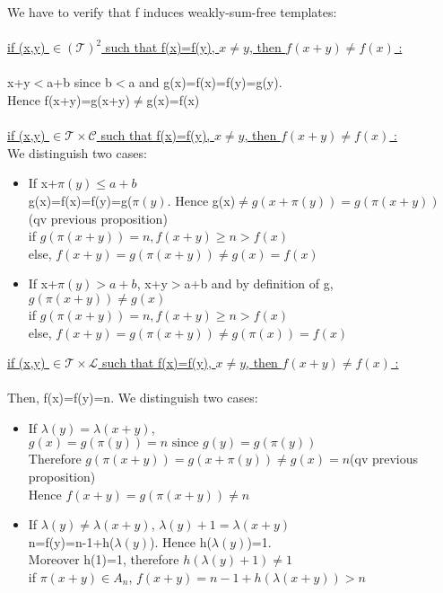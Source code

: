 We have to verify that f induces weakly-sum-free templates:\\
\\
\underline{if (x,y) \(\in (\mathcal{T})^2\) such that f(x)=f(y), \(x \neq y\), then \(f(x+y)\neq f(x)\)  :}\\
\\x+y\(<\)a+b since b\(<\)a and g(x)=f(x)=f(y)=g(y).
\\Hence f(x+y)=g(x+y)\(\neq\)g(x)=f(x)
\\\\
\underline{if (x,y) \(\in \mathcal{T} \times \mathcal{C}\) such that f(x)=f(y), \(x \neq y\), then \(f(x+y)\neq f(x)\)  :}\\
We distinguish two cases:


\begin{itemize}
\item If x+\(\pi(y)\leqslant a+b\)
\\g(x)=f(x)=f(y)=g(\(\pi(y)\). Hence g(x)\(\neq g(x+\pi(y))=g(\pi(x+y))\) (qv previous proposition)
\\if \(g(\pi(x+y))=n, f(x+y)\geqslant n > f(x)\)
\\else, \(f(x+y)=g(\pi(x+y))\neq g(x)=f(x)\)
\item If x+\(\pi(y)> a+b\), x+y\(>\)a+b and by definition of g, \(g(\pi(x+y))\neq g(x)\)
\\if \(g(\pi(x+y))=n, f(x+y)\geqslant n > f(x)\)
\\else, \(f(x+y)=g(\pi(x+y))\neq g(\pi(x))=f(x)\)
\end{itemize}


\underline{if (x,y) \(\in \mathcal{T} \times \mathcal{L}\) such that f(x)=f(y), \(x \neq y\), then \(f(x+y)\neq f(x)\)  :}\\
\\Then, f(x)=f(y)=n. We distinguish two cases:


\begin{itemize}
\item If \(\lambda(y)=\lambda(x+y)\),
\\\(g(x)=g(\pi(y))=n \text{ since } g(y)=g(\pi(y))\)
\\Therefore \(g(\pi(x+y))=g(x+\pi(y)) \neq g(x)=n\)(qv previous proposition)
\\Hence \(f(x+y)=g(\pi(x+y))\neq n\)
\item If  \(\lambda(y)\neq \lambda(x+y)\), \(\lambda(y)+1= \lambda(x+y)\)\\
n=f(y)=n-1+h(\(\lambda(y)\)). Hence h(\(\lambda(y)\))=1.
\\Moreover h(1)=1, therefore \(h(\lambda(y)+1) \neq 1\)
\\if \(\pi(x+y) \in A_n\), \(f(x+y)=n-1+h(\lambda(x+y))>n\)
\end{itemize}

